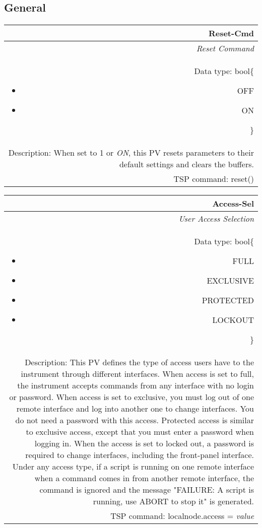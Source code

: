 \documentclass[openany]{article}
\begin{document}
	\subsection{General}\label{pvgroup:general}

		\paragraph{} %

		\begin{tabular}{N}
			\hline
			\bfseries Reset-Cmd\label{pv:reset-cmd} \\ \hline
			\emph{Reset Command} \\
			Data type: bool\{\begin{itemize}[noitemsep]
				\small
				\item[] OFF
				\item[] ON
			\end{itemize}\} \\
			Description: When set to 1 or \emph{ON}, this PV resets parameters to their default settings and clears the buffers. \\
			TSP command: reset()
		\end{tabular}

		\begin{tabular}{N}
			\hline
			\bfseries Access-Sel\label{pv:access-sel} \\ \hline
			\emph{User Access Selection} \\
			Data type: bool\{\begin{itemize}[noitemsep]
				\small
				\item[] FULL
				\item[] EXCLUSIVE
				\item[] PROTECTED
				\item[] LOCKOUT
			\end{itemize}\} \\
			Description: This PV defines the type of access users have to the instrument through different interfaces. When access is set to full, the instrument accepts commands from any interface with no login or password. When access is set to exclusive, you must log out of one remote interface and log into another one to change interfaces. You do not need a password with this access. Protected access is similar to exclusive access, except that you must enter a password when logging in. When the access is set to locked out, a password is required to change interfaces, including the front-panel interface. Under any access type, if a script is running on one remote interface when a command comes in from another remote interface, the command is ignored and the message "FAILURE: A script is running, use ABORT to stop it" is generated. \\
			TSP command: localnode.access = \emph{value}
		\end{tabular}
\end{document}
